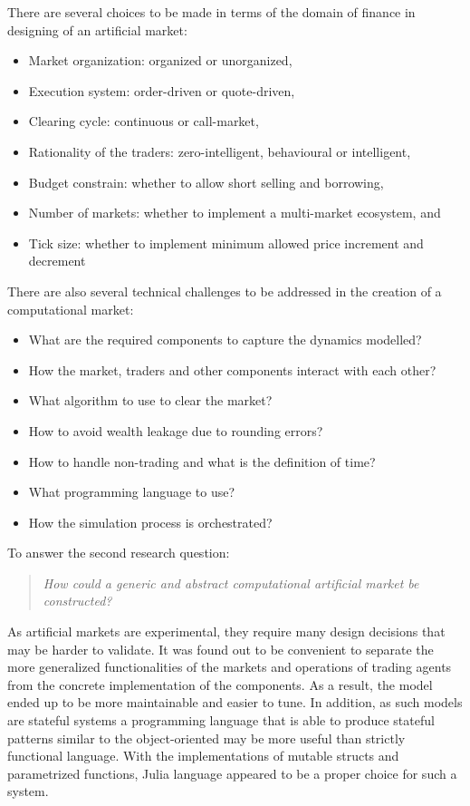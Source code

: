 There are several choices to be made in terms of the domain of finance 
in designing of an artificial market:
\begin{itemize}
    \item Market organization: organized or unorganized,
	\item Execution system: order-driven or quote-driven,
	\item Clearing cycle: continuous or call-market,
    \item Rationality of the traders: zero-intelligent, behavioural or intelligent,
    \item Budget constrain: whether to allow short selling and borrowing, 
    \item Number of markets: whether to implement a multi-market ecosystem, and 
    \item Tick size: whether to implement minimum allowed price increment and decrement
\end{itemize}

There are also several technical challenges to be addressed in the creation 
of a computational market:
\begin{itemize}
    \item What are the required components to capture the dynamics modelled?
	\item How the market, traders and other components interact with each other?
	\item What algorithm to use to clear the market?
	\item How to avoid wealth leakage due to rounding errors?
	\item How to handle non-trading and what is the definition of time?
	\item What programming language to use?
	\item How the simulation process is orchestrated?
\end{itemize}

To answer the second research question:
\begin{quote}
    \textit{How could a generic and abstract computational artificial market be constructed?} 
\end{quote}

As artificial markets are experimental, they require many design decisions that may be harder to 
validate. It was found out to be convenient to separate the more generalized functionalities of the markets and 
operations of trading agents from the concrete implementation of the components. As a result, the 
model ended up to be more maintainable and easier to tune. In addition, as such models are stateful systems
a programming language that is able to produce stateful patterns similar to the object-oriented may 
be more useful than strictly functional language. With the implementations of mutable structs and parametrized 
functions, Julia language appeared to be a proper choice for such a system.

